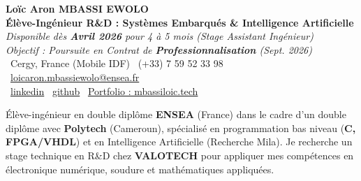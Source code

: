 \documentclass[a4paper,11pt]{article}
\begin{document}
\begin{center}
    {\Large \textbf{Loïc Aron MBASSI EWOLO}} \\ \vspace{4pt}
    \textbf{\large Élève-Ingénieur R\&D : Systèmes Embarqués \& Intelligence Artificielle} \\
    \textit{\small Disponible dès\textbf{ Avril 2026} pour 4 à 5 mois (Stage Assistant Ingénieur)} \\
    \textit{\small Objectif : Poursuite en Contrat de \textbf{Professionnalisation} (Sept. 2026)} \\ \vspace{4pt}
    \small
    \faMapMarker\ Cergy, France (Mobile IDF) \quad
    \faPhone\ (+33) 7 59 52 33 98 \quad
    \faEnvelope\ \href{mailto:loicaron.mbassiewolo@ensea.fr}{loicaron.mbassiewolo@ensea.fr} \\ \vspace{2pt}
    \faLinkedin\ \href{https://www.linkedin.com/in/loic-aron-mbassi-ewolo-3942a9246/}{linkedin} \quad
    \faGithub\ \href{https://github.com/Nameless0l}{github} \quad
    \faGlobe\ \href{https://mbassiloic.tech/\#portfolio}{Portfolio : mbassiloic.tech}
\end{center}

\vspace{-6pt}

\noindent\small{Élève-ingénieur en double diplôme \textbf{ENSEA} (France) dans le cadre d'un double diplôme avec \textbf{Polytech} (Cameroun), spécialisé en programmation bas niveau (\textbf{C, FPGA/VHDL}) et en Intelligence Artificielle (Recherche Mila). Je recherche un stage technique en R\&D chez \textbf{VALOTECH} pour appliquer mes compétences en électronique numérique, soudure et mathématiques appliquées.}

\end{document}
